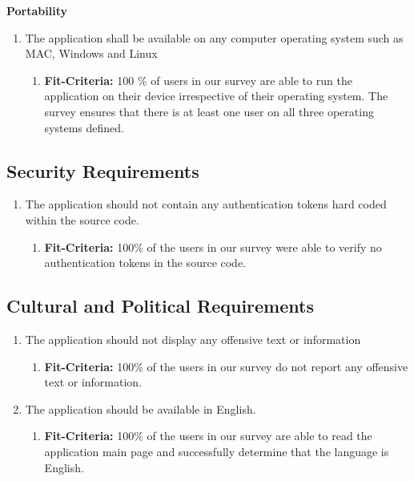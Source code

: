 \documentclass{article}
\begin{document}
\noindent
\textbf{Portability} 
\begin{enumerate}
\item The application shall be available on any computer operating system such as MAC, Windows and Linux
   \begin{enumerate}
    \item \textbf{Fit-Criteria:}  100 \% of users in our survey are able to run the application on their device irrespective of their operating system. The survey ensures that there is at least one user on all three operating systems defined. 
    \end{enumerate}
\end{enumerate}


\subsection{Security Requirements}
\begin{enumerate}
\item The application should not contain any authentication tokens hard coded within the source code. 
   \begin{enumerate}
    \item \textbf{Fit-Criteria:}  100\% of the users in our survey were able to verify no authentication tokens in the source code.
    \end{enumerate}
\end{enumerate}

\subsection{Cultural and Political Requirements}
\begin{enumerate}
\item The application should not display any offensive text or information 
   \begin{enumerate}
    \item \textbf{Fit-Criteria:}  100\% of the users in our survey do not report any offensive text or information. 
    \end{enumerate}
\item The application should be available in English. 
   \begin{enumerate}
    \item \textbf{Fit-Criteria:}  100\% of the users in our survey are able to read the application main page and successfully determine that the language is English. 
    \end{enumerate}
\end{enumerate}
\end{document}
